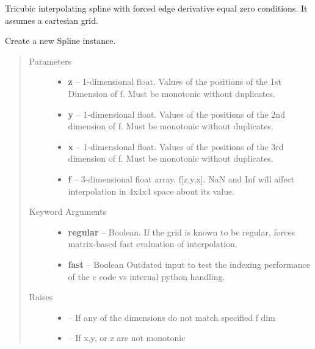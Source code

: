 \documentclass[letterpaper,10pt,english]{sphinxmanual}
\begin{document}
\begin{fulllineitems}
\label{eqtools:eqtools.trispline.Spline}
Tricubic interpolating spline with forced edge derivative equal zero
conditions.  It assumes a cartesian grid.

Create a new Spline instance.
\begin{quote}\begin{description}
\item[{Parameters }] \leavevmode\begin{itemize}
\item {} 
\textbf{z} --
1-dimensional float.
Values of the positions of the 1st
Dimension of f. Must be monotonic without duplicates.

\item {} 
\textbf{y} --
1-dimensional float.
Values of the positions of the 2nd
dimension of f. Must be monotonic without duplicates.

\item {} 
\textbf{x} --
1-dimensional float.
Values of the positions of the 3rd
dimension of f. Must be monotonic without duplicates.

\item {} 
\textbf{f} --
3-dimensional float array.
f{[}z,y,x{]}. NaN and Inf will
affect interpolation in 4x4x4 space about its value.

\end{itemize}

\item[{Keyword Arguments}] \leavevmode\begin{itemize}
\item {} 
\textbf{regular} --
Boolean.
If the grid is known to be regular, forces
matrix-based fast evaluation of interpolation.

\item {} 
\textbf{fast} --
Boolean
Outdated input to test the indexing performance of the c
code vs internal python handling.

\end{itemize}

\item[{Raises }] \leavevmode\begin{itemize}
\item {} 
 -- 
If any of the dimensions do not match specified f dim

\item {} 
 -- 
If x,y, or z are not monotonic


\end{itemize}
\end{description}
\end{quote}
\end{fulllineitems}
\end{document}
